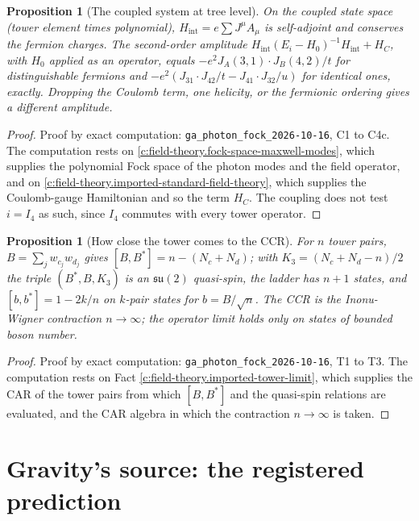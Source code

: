 \documentclass[11pt]{article}
\newtheorem{proposition}[theorem]{Proposition}
\theoremstyle{definition}
\theoremstyle{plain}
\begin{document}
\begin{proposition}[The coupled system at tree level]\label{c:field-theory.coupled-system-tree-level}
On the coupled state space (tower element times polynomial), $H_{\mathrm{int}} = e\sum J^\mu A_\mu$ is self-adjoint and conserves the fermion charges. The second-order amplitude $H_{\mathrm{int}}(E_i - H_0)^{-1}H_{\mathrm{int}} + H_C$, with $H_0$ applied as an operator, equals $-e^2J_A(3,1)\cdot J_B(4,2)/t$ for distinguishable fermions and $-e^2(J_{31}\cdot J_{42}/t - J_{41}\cdot J_{32}/u)$ for identical ones, exactly. Dropping the Coulomb term, one helicity, or the fermionic ordering gives a different amplitude.
\end{proposition}
\begin{proof}
Proof by exact computation: \texttt{ga\_photon\_fock\_2026-10-16}, C1 to C4c. The computation rests on \ref{c:field-theory.fock-space-maxwell-modes}, which supplies the polynomial Fock space of the photon modes and the field operator, and on \ref{c:field-theory.imported-standard-field-theory}, which supplies the Coulomb-gauge Hamiltonian and so the term $H_C$. The coupling does not test $i = I_4$ as such, since $I_4$ commutes with every tower operator.

\end{proof}

\begin{proposition}[How close the tower comes to the CCR]\label{c:field-theory.how-close-tower-comes-ccr}
For $n$ tower pairs, $B = \sum_jw_{c_j}w_{d_j}$ gives $[B, B^*] = n - (N_c + N_d)$; with $K_3 = (N_c + N_d - n)/2$ the triple $(B^*, B, K_3)$ is an $\mathfrak{su}(2)$ quasi-spin, the ladder has $n + 1$ states, and $[b, b^*] = 1 - 2k/n$ on $k$-pair states for $b = B/\sqrt{n}$. The CCR is the Inonu-Wigner contraction $n \to \infty$; the operator limit holds only on states of bounded boson number.
\end{proposition}
\begin{proof}
Proof by exact computation: \texttt{ga\_photon\_fock\_2026-10-16}, T1 to T3. The computation rests on Fact \ref{c:field-theory.imported-tower-limit}, which supplies the CAR of the tower pairs from which $[B, B^{*}]$ and the quasi-spin relations are evaluated, and the CAR algebra in which the contraction $n \to \infty$ is taken.

\end{proof}

\section{Gravity's source: the registered prediction}
\end{document}
